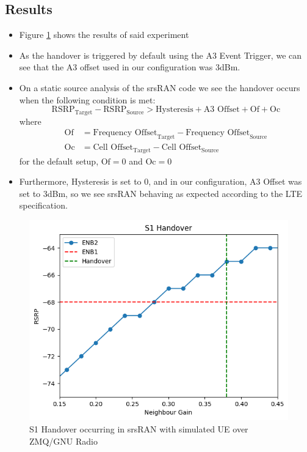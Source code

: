 \subsection{Results}
\begin{itemize}
    \item Figure \ref{fig:methods:zmq-s1-handover} shows the results of said experiment
    \item As the handover is triggered by default using the A3 Event Trigger, we can see that the A3 offset used in our configuration was 3dBm.
    \item On a static source analysis of the srsRAN code we see the handover occurs when the following condition is met:
$$\text{RSRP}_\text{Target} - \text{RSRP}_\text{Source} > \text{Hysteresis} + \text{A3 Offset} + \text{Of} + \text{Oc}$$
where 
$$\begin{aligned}\text{Of} &= \text{Frequency Offset}_\text{Target} - \text{Frequency Offset}_\text{Source} \\
\text{Oc} &= \text{Cell Offset}_\text{Target} - \text{Cell Offset}_\text{Source}\end{aligned}$$
for the default setup, $\text{Of}=0$ and $\text{Oc}=0$
\item Furthermore, Hysteresis is set to 0, and in our configuration, A3 Offset was set to 3dBm, so we see srsRAN behaving as expected according to the LTE specification.
\end{itemize}
\begin{figure}
    \centering
    \includegraphics[width=1\linewidth]{src/img/zmq_s1_handover.png}
    \caption{S1 Handover occurring in srsRAN with simulated UE over ZMQ/GNU Radio}
    \label{fig:methods:zmq-s1-handover}
\end{figure}
